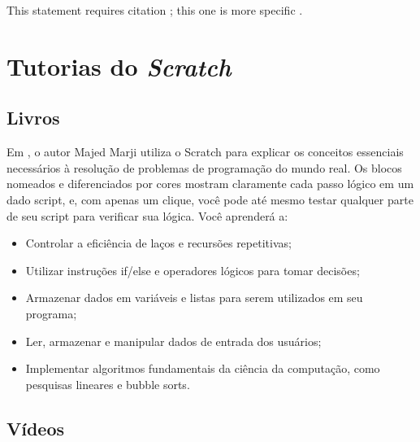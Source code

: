\documentclass[12pt,fleqn]{book} %
\begin{document}
This statement requires citation \cite{book_key}; this one is more specific \cite[122]{article_key}.

\lipsum[1-7] %



\chapter{Tutorias do \textit{Scratch}}

\lipsum[1-2] %

\section{Livros}

Em , o autor Majed Marji utiliza o Scratch para explicar os conceitos essenciais necessários à resolução de problemas de programação do mundo real. Os blocos nomeados e diferenciados por cores mostram claramente cada passo lógico em um dado script, e, com apenas um clique, você pode até mesmo testar qualquer parte de seu script para verificar sua lógica. Você aprenderá a:

\begin{itemize}
	\item Controlar a eficiência de laços e recursões repetitivas;
	\item Utilizar instruções if/else e operadores lógicos para tomar decisões;
	\item Armazenar dados em variáveis e listas para serem utilizados em seu programa;
	
	\item Ler, armazenar e manipular dados de entrada dos usuários;
	\item Implementar algoritmos fundamentais da ciência da computação, como pesquisas lineares e bubble sorts.
\end{itemize}

\section{Vídeos}
\end{document}
